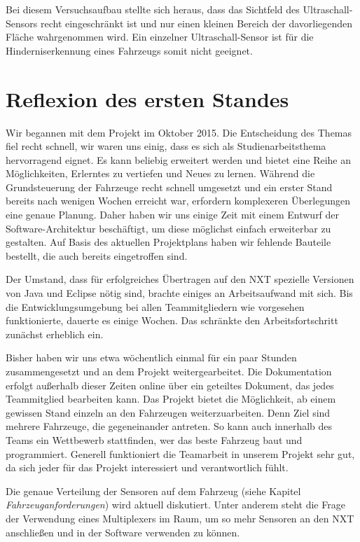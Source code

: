 \documentclass[a4paper,12pt]{article}                                         %
\numberwithin{table}{section}                               %
\numberwithin{figure}{section}                              %
\begin{document}
	\bigskip
	Bei diesem Versuchsaufbau stellte sich heraus, dass das Sichtfeld des Ultraschall-Sensors recht eingeschränkt ist und nur einen kleinen Bereich der davorliegenden Fläche wahrgenommen wird. Ein einzelner Ultraschall-Sensor ist für die Hinderniserkennung eines Fahrzeugs somit nicht geeignet.
	
	\newpage
	\section{Reflexion des ersten Standes}
	Wir begannen mit dem Projekt im Oktober 2015. Die Entscheidung des Themas fiel recht schnell, wir waren uns einig, dass es sich als Studienarbeitsthema hervorragend eignet. Es kann beliebig erweitert werden und bietet eine Reihe an Möglichkeiten, Erlerntes zu vertiefen und Neues zu lernen. Während die Grundsteuerung der Fahrzeuge recht schnell umgesetzt und ein erster Stand bereits nach wenigen Wochen erreicht war, erfordern komplexeren Überlegungen eine genaue Planung. Daher haben wir uns einige Zeit mit einem Entwurf der Software-Architektur beschäftigt, um diese möglichst einfach erweiterbar zu gestalten. Auf Basis des aktuellen Projektplans haben wir fehlende Bauteile bestellt, die auch bereits eingetroffen sind. 
	
	\bigskip
	Der Umstand, dass für erfolgreiches Übertragen auf den NXT spezielle Versionen von Java und Eclipse nötig sind, brachte einiges an Arbeitsaufwand mit sich. Bis die Entwicklungsumgebung bei allen Teammitgliedern wie vorgesehen funktionierte, dauerte es einige Wochen. Das schränkte den Arbeitsfortschritt zunächst erheblich ein. 
	
	\bigskip
	Bisher haben wir uns etwa wöchentlich einmal für ein paar Stunden zusammengesetzt und an dem Projekt weitergearbeitet. Die Dokumentation erfolgt außerhalb dieser Zeiten online über ein geteiltes Dokument, das jedes Teammitglied bearbeiten kann. Das Projekt bietet die Möglichkeit, ab einem gewissen Stand einzeln an den Fahrzeugen weiterzuarbeiten. Denn Ziel sind mehrere Fahrzeuge, die gegeneinander antreten. So kann auch innerhalb des Teams ein Wettbewerb stattfinden, wer das beste Fahrzeug baut und programmiert. 
	Generell funktioniert die Teamarbeit in unserem Projekt sehr gut, da sich jeder für das Projekt interessiert und verantwortlich fühlt.
	
	\bigskip
	Die genaue Verteilung der Sensoren auf dem Fahrzeug (siehe Kapitel \textit{Fahrzeuganforderungen}) wird aktuell diskutiert. Unter anderem steht die Frage der Verwendung eines Multiplexers im Raum, um so mehr Sensoren an den NXT anschließen und in der Software verwenden zu können. 
	
\end{document}
